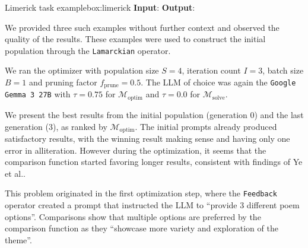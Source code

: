 \begin{figurebox}{Limerick task example}{box:limerick}
    \textbf{Input}:
    \textbf{Output}:
\end{figurebox}

We provided three such examples without further context and observed the quality of the results. These examples were used to construct the initial population through
the \texttt{Lamarckian} operator.

We ran the optimizer with population size $S=4$, iteration count $I=3$, batch size $B=1$ and pruning factor $f_{\text{prune}} = 0.5$.
The LLM of choice was again the \texttt{Google Gemma 3 27B} with $\tau = 0.75$ for $\mathscr{M}_{\text{optim}}$ and $\tau = 0.0$ for $\mathscr{M}_{\text{solve}}$.

We present the best results from the initial population (generation $0$) and the last generation ($3$), as ranked by $\mathscr{M}_{\text{optim}}$.
The initial prompts already produced satisfactory results, with the winning result making sense and having only one error in alliteration.
However during the optimization, it seems that the comparison function started favoring longer results, consistent with findings of Ye et al.\cite{ye2024justiceprejudicequantifyingbiases}.

This problem originated in the first optimization step, where the \texttt{Feedback} operator created a prompt that instructed the LLM to ``provide 3 different poem options''.
Comparisons show that multiple options are preferred by the comparison function as they ``showcase more variety and exploration of the theme''.

